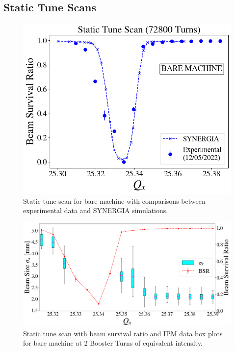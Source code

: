 \subsection{Static Tune Scans}

\begin{figure}[H]
    \centering
    \includegraphics[width=\columnwidth]{chapter4/static2turns.png}
    \caption{Static tune scan for bare machine with comparisons between experimental data and SYNERGIA simulations.}
    \label{fig:static2}
\end{figure}


\begin{figure}[H]
    \centering
    \includegraphics[width=\columnwidth]{chapter4/static2turns_ipm.png}
    \caption{Static tune scan with beam survival ratio and IPM data box plots for bare machine at 2 Booster Turns of equivalent intensity.}
    \label{fig:static2_ipm}
\end{figure}


